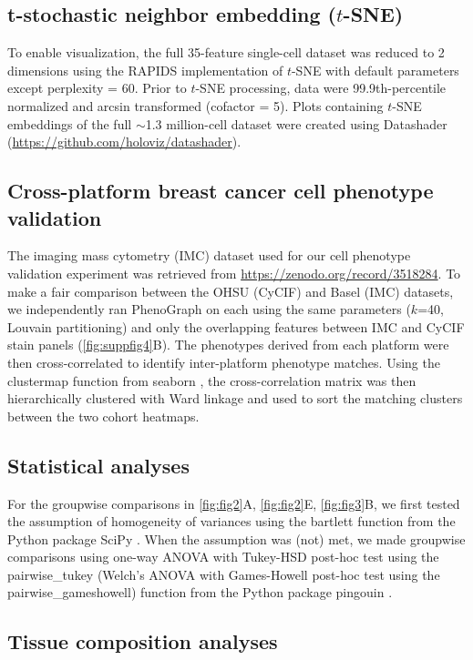 \documentclass[preprint,review,3p,12pt]{elsarticle}
\begin{document}
\subsection{t-stochastic neighbor embedding ($t$-SNE)}
To enable visualization, the full 35-feature single-cell dataset was reduced to 2 dimensions using the RAPIDS implementation of $t$-SNE \cite{tsne2008} with default parameters except perplexity = 60. Prior to $t$-SNE processing, data were 99.9th-percentile normalized and arcsin transformed (cofactor = 5). Plots containing $t$-SNE embeddings of the full $\sim$1.3 million-cell dataset were created using Datashader (\url{https://github.com/holoviz/datashader}).

\subsection{Cross-platform breast cancer cell phenotype validation}
The imaging mass cytometry (IMC) dataset \cite{jackson_single-cell_2020} used for our cell phenotype validation experiment was retrieved from \url{https://zenodo.org/record/3518284}. To make a fair comparison between the OHSU (CyCIF) and Basel (IMC) datasets, we independently ran PhenoGraph on each using the same parameters ($k$=40, Louvain partitioning) and only the overlapping features between IMC and CyCIF stain panels (\autoref{fig:suppfig4}B). The phenotypes derived from each platform were then cross-correlated to identify inter-platform phenotype matches. Using the clustermap function from seaborn \cite{seaborn2020}, the cross-correlation matrix was then hierarchically clustered with Ward linkage and used to sort the matching clusters between the two cohort heatmaps.

\subsection{Statistical analyses}
For the groupwise comparisons in \autoref{fig:fig2}A, \autoref{fig:fig2}E, \autoref{fig:fig3}B, we first tested the assumption of homogeneity of variances using the bartlett function from the Python package SciPy \cite{scipy2020}. When the assumption was (not) met, we made groupwise comparisons using one-way ANOVA with Tukey-HSD post-hoc test using the pairwise\_tukey (Welch's ANOVA with Games-Howell post-hoc test using the pairwise\_gameshowell) function from the Python package pingouin \cite{pingouin2018}.

\subsection{Tissue composition analyses}
\end{document}
